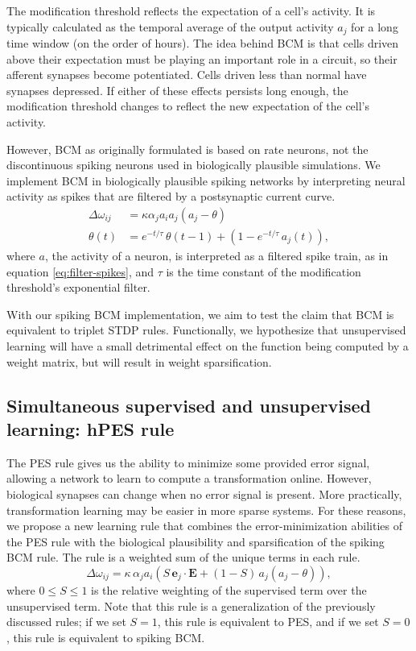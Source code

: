 \documentclass[10pt,letterpaper]{article}
\begin{document}
The modification threshold reflects the expectation
of a cell's activity.
It is typically calculated as
the temporal average of the output activity $a_j$
for a long time window (on the order of hours).
The idea behind BCM is that cells
driven above their expectation
must be playing an important role in a circuit,
so their afferent synapses become potentiated.
Cells driven less than normal have synapses depressed.
If either of these effects persists long enough,
the modification threshold changes
to reflect the new expectation
of the cell's activity.

However, BCM as originally formulated
is based on rate neurons,
not the discontinuous spiking neurons
used in biologically plausible simulations.
We implement BCM in biologically plausible spiking networks
by interpreting neural activity as
spikes that are filtered by
a postsynaptic current curve.
\begin{align} \label{eq:bcm}
  \Delta \omega_{ij} &= \kappa \alpha_j a_i a_j (a_j - \theta) \nonumber \\
  \theta(t) &= e^{-t / \tau} \, \theta(t-1) +
               (1 - e^{-t / \tau} \, a_j(t)),
\end{align}
where $a$, the activity of a neuron,
is interpreted as a filtered spike train,
as in equation \eqref{eq:filter-spikes},
and $\tau$ is
the time constant of
the modification threshold's exponential filter.

With our spiking BCM implementation,
we aim to test the claim that BCM is equivalent
to triplet STDP rules.
Functionally, we hypothesize that
unsupervised learning
will have a small detrimental effect
on the function being computed by a weight matrix,
but will result in weight sparsification.

\subsection{Simultaneous supervised and unsupervised learning: hPES rule}

The PES rule gives us the ability to
minimize some provided error signal,
allowing a network to
learn to compute a transformation online.
However, biological synapses can change
when no error signal is present.
More practically,
transformation learning may be easier
in more sparse systems.
For these reasons, we propose a new learning rule
that combines the error-minimization abilities of the PES rule
with the biological plausibility and sparsification
of the spiking BCM rule.
The rule is a weighted sum of the
unique terms in each rule.
\begin{equation} \label{eq:hpes}
  \Delta \omega_{ij} = \kappa \, \alpha_j a_i \left(
    S \, \mathbf{e}_j \cdot \mathbf{E} + (1 - S) \, a_j(a_j - \theta) \right),
\end{equation}
where $0 \le S \le 1$ is the relative weighting of
the supervised term over the unsupervised term.
Note that this rule is a generalization
of the previously discussed rules;
if we set $S = 1$,
this rule is equivalent to PES, and
if we set $S = 0$,
this rule is equivalent to spiking BCM.
\end{document}
